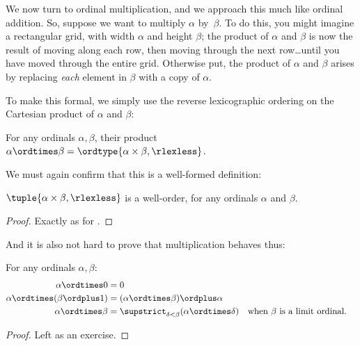 \documentclass[../../../include/open-logic-section]{subfiles}
\begin{document}


We now turn to ordinal multiplication, and we approach this much like
ordinal addition. So, suppose we want to multiply $\alpha$ by~$\beta$.
To do this, you might imagine a rectangular grid, with width $\alpha$
and height $\beta$; the product of $\alpha$ and $\beta$ is now the
result of moving along each row, then moving through the next
row\ldots until you have moved through the entire grid. Otherwise put,
the product of $\alpha$ and $\beta$ arises by replacing \emph{each}
element in $\beta$ with a copy of $\alpha$.  

To make this formal, we simply use the reverse lexicographic ordering
on the Cartesian product of $\alpha$ and $\beta$:

\begin{defn}
For any ordinals $\alpha, \beta$, their product $\alpha \ordtimes \beta = \ordtype{\alpha \times \beta, \rlexless}$.
\end{defn}

We must again confirm that this is a well-formed definition:

\begin{lem}
$\tuple{\alpha \times \beta, \rlexless}$ is a well-order, for any
ordinals $\alpha$ and $\beta$.
\end{lem}

\begin{proof}
Exactly as for .
\end{proof}

And it is also not hard to prove that multiplication behaves thus:

\begin{lem}
For any ordinals $\alpha, \beta$:
\begin{align*}
	\alpha \ordtimes 0 &= 0\\
	\alpha \ordtimes (\beta \ordplus 1) &= 
		(\alpha \ordtimes \beta) \ordplus \alpha\\
	\alpha  \ordtimes \beta &= 
		\supstrict_{\delta < \beta}(\alpha \ordtimes \delta) && 
		\text{when $\beta$ is a limit ordinal}.
\end{align*}
\end{lem}

\begin{proof}
Left as an exercise.
\end{proof}
\end{document}
